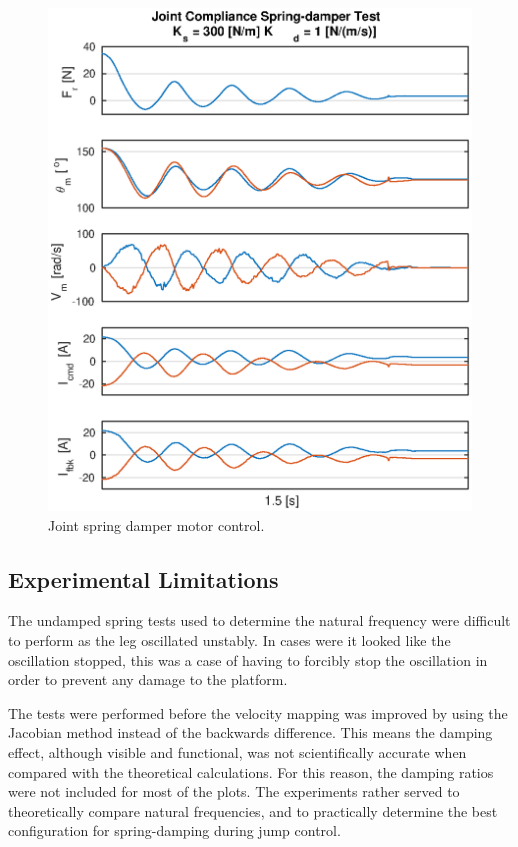 \begin{figure}
\centering
\includegraphics[width=1\textwidth]{images/experiments/joint-spring-damper-control-output.eps} 
\caption{Joint spring damper motor control.}
\label{fig:joint-spring-damper-motor-control}
\end{figure}

\subsection{Experimental Limitations}
\label{sec:Spring-Damper-Test:Experimental Limitations}

The undamped spring tests used to determine the natural frequency were difficult to perform as the leg oscillated unstably. In cases were it looked like the oscillation stopped, this was a case of having to forcibly stop the oscillation in order to prevent any damage to the platform.

The tests were performed before the velocity mapping was improved by using the Jacobian method instead of the backwards difference. This means the damping effect, although visible and functional, was not scientifically accurate when compared with the theoretical calculations. For this reason, the damping ratios were not included for most of the plots. The experiments rather served to theoretically compare natural frequencies, and to practically determine the best configuration for spring-damping during jump control. 

